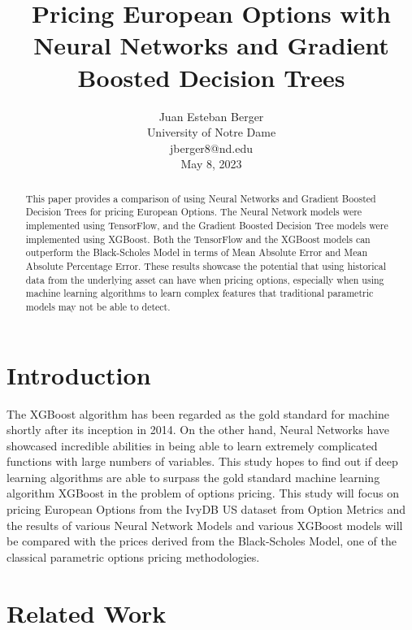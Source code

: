 \documentclass[a4paper]{article}
\title{Pricing European Options with Neural Networks and Gradient Boosted Decision Trees}
\author{
Juan Esteban Berger \\ University of Notre Dame \\ jberger8@nd.edu \\
May 8, 2023
}
\begin{document}
\maketitle

\begin{abstract}
This paper provides a comparison of using Neural Networks and Gradient Boosted Decision Trees for pricing European Options. The Neural Network models were implemented using TensorFlow, and the Gradient Boosted Decision Tree models were implemented using XGBoost. Both the TensorFlow and the XGBoost models can outperform the Black-Scholes Model in terms of Mean Absolute Error and Mean Absolute Percentage Error. These results showcase the potential that using historical data from the underlying asset can have when pricing options, especially when using machine learning algorithms to learn complex features that traditional parametric models may not be able to detect.
\end{abstract}


\section{Introduction}

The XGBoost algorithm has been regarded as the gold standard for machine shortly after its inception in 2014. On the other hand, Neural Networks have showcased incredible abilities in being able to learn extremely complicated functions with large numbers of variables. This study hopes to find out if deep learning algorithms are able to surpass the gold standard machine learning algorithm XGBoost in the problem of options pricing. This study will focus on pricing European Options from the IvyDB US dataset from Option Metrics and the results of various Neural Network Models and various XGBoost models will be compared with the prices derived from the Black-Scholes Model, one of the classical parametric options pricing methodologies.

\section{Related Work}
\end{document}
